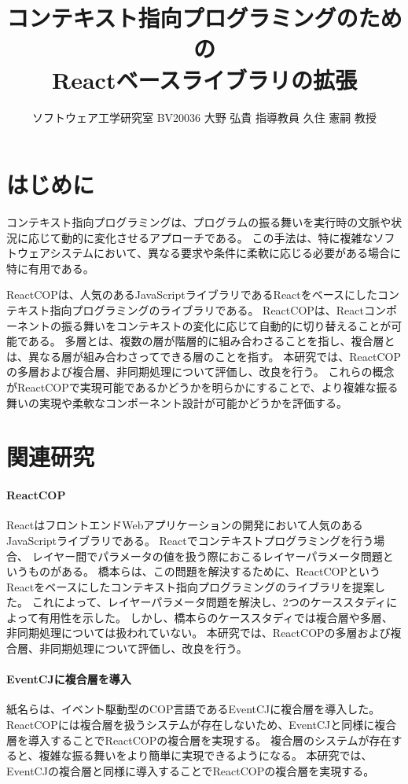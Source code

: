 \documentclass[twocolumn]{jarticle}
\title{
  \LARGE\bf
  コンテキスト指向プログラミングのための\\
  Reactベースライブラリの拡張 \\[1ex]}
\author{ソフトウェア工学研究室 \quad
        BV20036 大野 弘貴 \quad
        指導教員 久住 憲嗣 教授}
\date{}
\begin{document}
\maketitle
\thispagestyle{empty}

\section{はじめに}

コンテキスト指向プログラミングは、プログラムの振る舞いを実行時の文脈や状況に応じて動的に変化させるアプローチである。
この手法は、特に複雑なソフトウェアシステムにおいて、異なる要求や条件に柔軟に応じる必要がある場合に特に有用である。

ReactCOPは、人気のあるJavaScriptライブラリであるReactをベースにしたコンテキスト指向プログラミングのライブラリである。
ReactCOPは、Reactコンポーネントの振る舞いをコンテキストの変化に応じて自動的に切り替えることが可能である。
多層とは、複数の層が階層的に組み合わさることを指し、複合層とは、異なる層が組み合わさってできる層のことを指す。
本研究では、ReactCOPの多層および複合層、非同期処理について評価し、改良を行う。
これらの概念がReactCOPで実現可能であるかどうかを明らかにすることで、より複雑な振る舞いの実現や柔軟なコンポーネント設計が可能かどうかを評価する。

\section{関連研究}
\paragraph{ReactCOP}
ReactはフロントエンドWebアプリケーションの開発において人気のあるJavaScriptライブラリである。
Reactでコンテキストプログラミングを行う場合、 レイヤー間でパラメータの値を扱う際におこるレイヤーパラメータ問題というものがある。
橋本らは、この問題を解決するために、ReactCOPというReactをベースにしたコンテキスト指向プログラミングのライブラリを提案した。
これによって、レイヤーパラメータ問題を解決し、2つのケーススタディによって有用性を示した。
しかし、橋本らのケーススタディでは複合層や多層、非同期処理については扱われていない。
本研究では、ReactCOPの多層および複合層、非同期処理について評価し、改良を行う。

\paragraph{EventCJに複合層を導入}
紙名らは、イベント駆動型のCOP言語であるEventCJに複合層を導入した。
ReactCOPには複合層を扱うシステムが存在しないため、EventCJと同様に複合層を導入することでReactCOPの複合層を実現する。
複合層のシステムが存在すると、複雑な振る舞いをより簡単に実現できるようになる。
本研究では、EventCJの複合層と同様に導入することでReactCOPの複合層を実現する。
\end{document}
